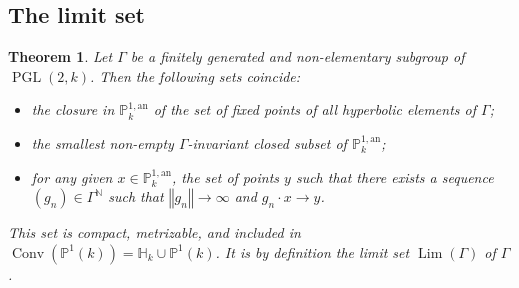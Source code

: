 \documentclass[10pt]{amsart}
\newtheorem{theo}{Theorem}[section]
\theoremstyle{definition}\newtheorem{defi}[theo]{Definition}\newtheorem{rema}[theo]{Remark}\newtheorem{exam}[theo]{Example}\newtheorem{exem}[theo]{Example}\newtheorem{nota}[theo]{Notation}
\DeclareMathOperator{\conv}{Conv}
\DeclareMathOperator{\Lm}{Lim}
\DeclareMathOperator{\PGL}{PGL}
\newcommand{\nn}{\mathbb{N}}
\newcommand{\hh}{\mathbb{H}}
\newcommand{\an}{\mathrm{an}}
\newcommand{\norm}[1]{\left\Vert#1\right\Vert}
\newcommand{\PP}{\mathbb{P}}
\newcommand{\PGLk}{\PGL(2, k)}
\begin{document}
\subsection{The limit set}

\begin{theo}\label{thm:struct limit}
Let $\Gamma$ be a finitely generated and non-elementary subgroup of $\PGLk$. Then the following sets coincide:
\begin{itemize}
\item the closure in $\PP^{1,\an}_k$ of the set of fixed points of all hyperbolic elements of $\Gamma$;
\item the smallest non-empty $\Gamma$-invariant closed subset of $\PP^{1,\an}_k$;
\item for any given $x\in \PP^{1,\an}_k$, the set of points $y$ such that there exists a sequence $(g_n)\in \Gamma^\nn$ such that $\norm{g_n}\to\infty$ and $g_n \cdot x \to y$.
\end{itemize}
This set is compact, metrizable, and included in $\conv(\PP^1(k)) =\hh_k \cup \PP^1(k)$. It is by definition the limit set $\Lm(\Gamma)$ of $\Gamma$.
\end{theo}
\end{document}

